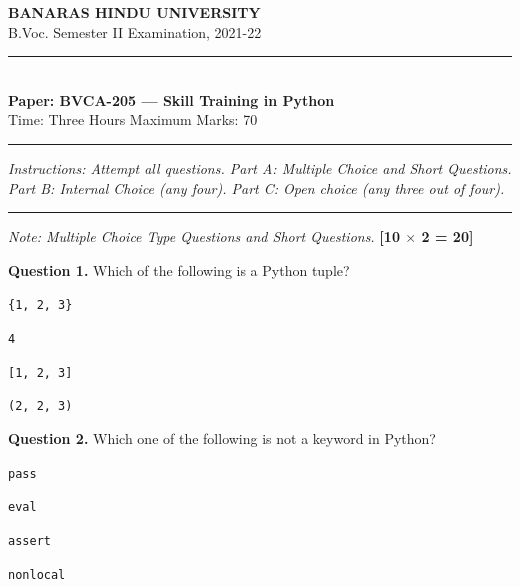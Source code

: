 \documentclass[11pt,a4paper]{article}
\begin{document}
\begin{center}
  {\large\bfseries BANARAS HINDU UNIVERSITY}\\[2pt]
  {\normalsize B.Voc. Semester II Examination, 2021-22}\\[6pt]
  \rule{0.8\linewidth}{0.5pt}\\[6pt]
  {\large\bfseries Paper: BVCA-205 --- Skill Training in Python}\\[4pt]
  {\normalsize Time: Three Hours \hfill Maximum Marks: 70}
\end{center}

\rule{\linewidth}{0.4pt}

\smallskip



\noindent   \textit{Instructions: Attempt all questions. Part A: Multiple Choice and Short Questions. Part B: Internal Choice (any four). Part C: Open choice (any three out of four).}

\bigskip

\bigskip


\rule{\linewidth}{0.4pt}\smallskip




\noindent   \textit{Note: Multiple Choice Type Questions and Short Questions.} \hfill   \textbf{[10 $ \times$ 2 = 20]}

\medskip


\noindent   \textbf{Question 1.} Which of the following is a Python tuple?

\begin{parts}
  \item   \texttt{\{1, 2, 3\}}
  \item   \texttt{4}
  \item   \texttt{[1, 2, 3]}
  \item   \texttt{(2, 2, 3)}
\end{parts}

\medskip


\noindent   \textbf{Question 2.} Which one of the following is not a keyword in Python?

\begin{parts}
  \item   \texttt{pass}
  \item   \texttt{eval}
  \item   \texttt{assert}
  \item   \texttt{nonlocal}
\end{parts}

\medskip
\end{document}
